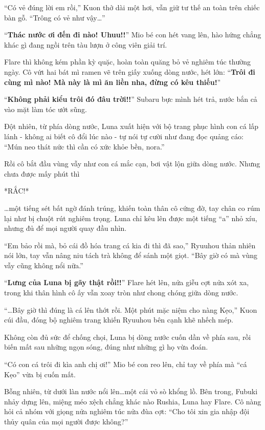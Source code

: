 \documentclass[../main.tex]{subfiles}
\begin{document}
``Có vẻ đúng lời em rồi,'' Kuon thở dài một hơi, vẫn giữ tư thế an toàn trên chiếc bàn gỗ. ``Trông có vẻ như vậy\dots''

``\textbf{Thác nước ơi đến đi nào! Uhuu!!}'' Mio bé con hét vang lên, hào hứng chẳng khác gì đang ngồi trên tàu lượn ở công viên giải trí.

Flare thì không kém phần kỳ quặc, hoàn toàn quăng bỏ vẻ nghiêm túc thường ngày. Cô vứt hai bát mì ramen vẽ trên giấy xuống dòng nước, hét lớn: ``\textbf{Trôi đi cùng mì nào! Mà này là mì ăn liền nha, đừng có kêu thiếu!}''


``\textbf{Không phải kiểu trôi đó đâu trời!!}'' Subaru bực mình hét trả, nước bắn cả vào mặt làm tóc ướt sũng.

Đột nhiên, từ phía dòng nước, Luna xuất hiện với bộ trang phục hình con cá lấp lánh - không ai biết cô đổi lúc nào - tự nói tự cười như đang đọc quảng cáo: ``Mún neo thát nức thì cần có xức khỏe bền, nora.''


Rồi cô bắt đầu vùng vẫy như con cá mắc cạn, bơi vật lộn giữa dòng nước. Nhưng chưa được mấy phút thì

*RẮC!*

\dots một tiếng sét bất ngờ đánh trúng, khiến toàn thân cô cứng đờ, tay chân co rúm lại như bị chuột rút nghiêm trọng. Luna chỉ kêu lên được một tiếng ``a'' nhỏ xíu, nhưng đủ để mọi người quay đầu nhìn.

``Em bảo rồi mà, bỏ cái đồ hóa trang cá kia đi thì đã sao,'' Ryuuhou thản nhiên nói lớn, tay vẫn nâng niu tách trà không để sánh một giọt. ``Bây giờ có mà vùng vẫy cũng không nổi nữa.''

``\textbf{Lưng của Luna bị gãy thật rồi!!}'' Flare hét lên, nửa giễu cợt nửa xót xa, trong khi thân hình cô ấy vẫn xoay tròn như chong chóng giữa dòng nước.

``\dots Bây giờ thì đúng là cá lên thớt rồi. Một phút mặc niệm cho nàng Kẹo,'' Kuon cúi đầu, đóng bộ nghiêm trang khiến Ryuuhou bên cạnh khẽ nhếch mép.

Không còn đủ sức để chống chọi, Luna bị dòng nước cuốn dần về phía sau, rồi biến mất sau những ngọn sóng, đúng như những gì họ vừa đoán.

``Có con cá trôi đi kìa anh chị ơi!'' Mio bé con reo lên, chỉ tay về phía mà ``cá Kẹo'' vừa bị cuốn mất.

Bỗng nhiên, từ dưới làn nước nổi lên\dots một cái vỏ sò khổng lồ. Bên trong, Fubuki nhảy dựng lên, miệng méo xệch chẳng khác nào Rushia, Luna hay Flare. Cô nàng hỏi cả nhóm với giọng nửa nghiêm túc nửa đùa cợt: ``Cho tôi xin gia nhập đội thủy quân của mọi người được không?''
\end{document}
